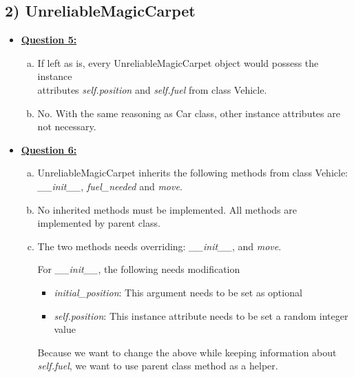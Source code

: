 \documentclass[12pt]{article}
\begin{document}
\bigskip

\subsection*{2) UnreliableMagicCarpet}

\begin{itemize}
    \item \underline{\textbf{Question 5:}}
    \begin{enumerate}[a.]
        \item If left as is, every UnreliableMagicCarpet object would possess
        the instance\\ attributes \textit{self.position} and \textit{self.fuel} from class Vehicle.

        \item No. With the same reasoning as Car class, other instance attributes are
        not necessary.
    \end{enumerate}
    \item \underline{\textbf{Question 6:}}
    \begin{enumerate}[a.]
        \item UnreliableMagicCarpet inherits the following methods from class Vehicle: \textit{\_\_init\_\_},
        \textit{fuel\_needed} and \textit{move}.
        \item No inherited methods must be implemented. All methods are implemented by parent class.
        \item

        The two methods needs overriding: \textit{\_\_init\_\_}, and \textit{move}.

        \bigskip

        For \textit{\_\_init\_\_}, the following needs modification

        \begin{itemize}
            \item \textit{initial\_position}: This argument needs to be set as optional
            \item \textit{self.position}: This instance attribute needs to be set a random integer value
        \end{itemize}

        \bigskip

        Because we want to change the above while keeping information about \textit{self.fuel},
        we want to use parent class method as a helper.

        \bigskip


\end{enumerate}
\end{itemize}
\end{document}
